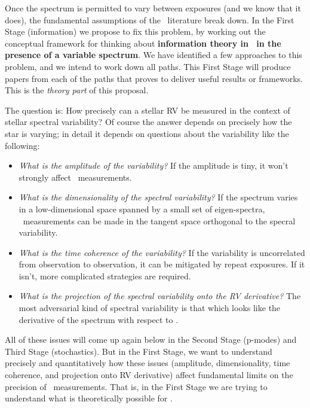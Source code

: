 \documentclass[12pt, letterpaper]{article}
\begin{document}
Once the spectrum is permitted to vary between exposures (and we know that
it does), the fundamental assumptions of the \EPRV\ literature break down.
In the First Stage (information) we propose to fix this problem, by
working out the conceptual framework for thinking about
\textbf{information theory in \EPRV\ in the presence of a variable
  spectrum}.
We have identified a few approaches to this problem, and we intend to
work down all paths.
This First Stage will produce papers from each of the paths that proves
to deliver useful results or frameworks.
This is the \emph{theory part} of this proposal.

The question is: How precisely can a stellar RV be measured in the context
of stellar spectral variability?
Of course the answer depends on precisely how the star is varying;
in detail it depends on questions about the variability like the following:
\begin{itemize}
\item
\emph{What is the amplitude of the variability?}
If the amplitude is tiny, it won't strongly affect \RV\ measurements.
\item
\emph{What is the dimensionality of the spectral variability?}
If the spectrum varies in a low-dimensional space spanned by a small set
of eigen-spectra, \EPRV\ measurements can be made in the tangent space
orthogonal to the specral variability.
\item
\emph{What is the time coherence of the variability?}
If the variability is uncorrelated from observation to observation, it
can be mitigated by repeat exposures. If it isn't, more complicated
strategies are required.
\item
\emph{What is the projection of the spectral variability onto the RV derivative?}
The most adversarial kind of spectral variability is that which looks
like the derivative of the spectrum with respect to \RV.
\end{itemize}
All of these issues will come up again below in the Second Stage (p-modes)
and Third Stage (stochastics).
But in the First Stage, we want to understand precisely and quantitatively
how these issues (amplitude, dimensionality, time coherence, and projection
onto RV derivative) affect fundamental limits on the precision of
\EPRV\ measurements.
That is, in the First Stage we are trying to understand what is theoretically
possible for \EPRV.
\end{document}

